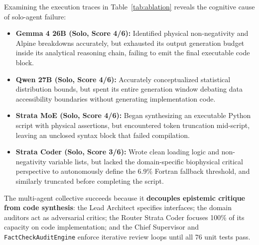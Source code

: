 \documentclass[11pt,a4paper]{article}
\begin{document}
Examining the execution traces in Table~\ref{tab:ablation} reveals the cognitive cause of solo-agent failure:
\begin{itemize}
    \item \textbf{Gemma 4 26B (Solo, Score 4/6):} Identified physical non-negativity and Alpine breakdowns accurately, but exhausted its output generation budget inside its analytical reasoning chain, failing to emit the final executable code block.
    \item \textbf{Qwen 27B (Solo, Score 4/6):} Accurately conceptualized statistical distribution bounds, but spent its entire generation window debating data accessibility boundaries without generating implementation code.
    \item \textbf{Strata MoE (Solo, Score 4/6):} Began synthesizing an executable Python script with physical assertions, but encountered token truncation mid-script, leaving an unclosed syntax block that failed compilation.
    \item \textbf{Strata Coder (Solo, Score 3/6):} Wrote clean loading logic and non-negativity variable lists, but lacked the domain-specific biophysical critical perspective to autonomously define the 6.9\% Fortran fallback threshold, and similarly truncated before completing the script.
\end{itemize}

The multi-agent collective succeeds because it \textbf{decouples epistemic critique from code synthesis}: the Lead Architect specifies interfaces; the domain auditors act as adversarial critics; the Router Strata Coder focuses 100\% of its capacity on code implementation; and the Chief Supervisor and \texttt{FactCheckAuditEngine} enforce iterative review loops until all 76 unit tests pass.
\end{document}

